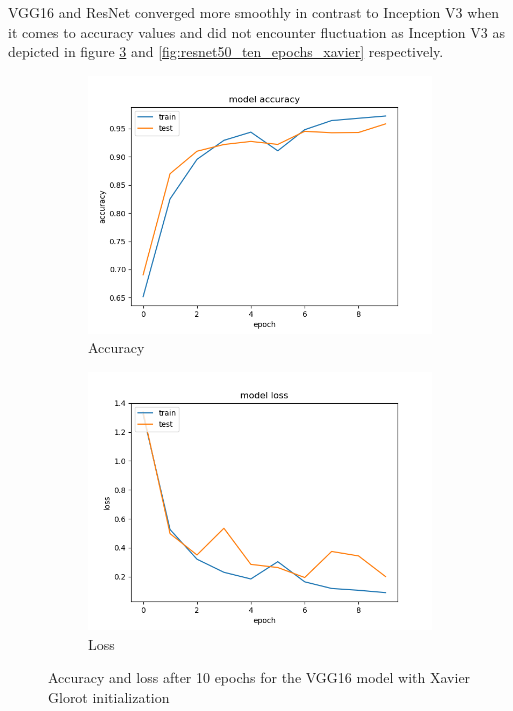 \documentclass{article}
\theoremstyle{definition}
\theoremstyle{remark}
\begin{document}
VGG16 and ResNet converged more smoothly in contrast to Inception V3 when it comes to accuracy values and did not encounter fluctuation as Inception V3 as depicted in figure \ref{fig:vgg16_ten_epochs_xavier} and \ref{fig:resnet50_ten_epochs_xavier} respectively.

\newpage


\begin{figure}[h!]
\centering
\begin{subfigure}{.5\textwidth}
  \centering
  \includegraphics[width=1.2\linewidth]{img/from_scratch_models/vgg16_acc.png}
  \caption{Accuracy}
  \label{fig:sub1}
\end{subfigure}%
\begin{subfigure}{.5\textwidth}
  \centering
  \includegraphics[width=1.2\linewidth]{img/from_scratch_models/vgg16_loss.png}
  \caption{Loss}
  \label{fig:sub2}
\end{subfigure}
\caption{Accuracy and loss after 10 epochs for the VGG16 model with Xavier Glorot initialization}
\label{fig:vgg16_ten_epochs_xavier}
\end{figure}
\end{document}
